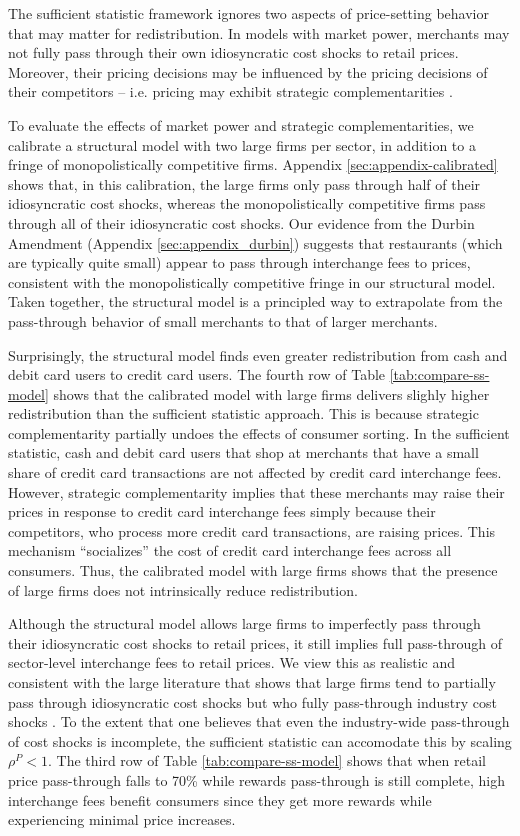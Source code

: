 \documentclass[main.tex]{subfiles}
\begin{document}
The sufficient statistic framework ignores two aspects of price-setting behavior that may matter for redistribution.
In models with market power, merchants may not fully pass through their own idiosyncratic cost shocks to retail prices.
Moreover, their pricing decisions may be influenced by the pricing decisions of their competitors -- i.e. pricing may exhibit strategic complementarities \citep{Amiti.etal2019}.

To evaluate the effects of market power and strategic complementarities, we calibrate a structural model with two large firms per sector, in addition to a fringe of monopolistically competitive firms.
Appendix \ref{sec:appendix-calibrated} shows that, in this calibration, the large firms only pass through half of their idiosyncratic cost shocks, whereas the monopolistically competitive firms pass through all of their idiosyncratic cost shocks.
Our evidence from the Durbin Amendment (Appendix \ref{sec:appendix_durbin}) suggests that restaurants (which are typically quite small) appear to pass through interchange fees to prices, consistent with the monopolistically competitive fringe in our structural model.
Taken together, the structural model is a principled way to extrapolate from the pass-through behavior of small merchants to that of larger merchants.

Surprisingly, the structural model finds even greater redistribution from cash and debit card users to credit card users.
The fourth row of Table \ref{tab:compare-ss-model} shows that the calibrated model with large firms delivers slighly higher redistribution than the sufficient statistic approach.
This is because strategic complementarity partially undoes the effects of consumer sorting.
In the sufficient statistic, cash and debit card users that shop at merchants that have a small share of credit card transactions are not affected by credit card interchange fees.
However, strategic complementarity implies that these merchants may raise their prices in response to credit card interchange fees simply because their competitors, who process more credit card transactions, are raising prices.
This mechanism ``socializes'' the cost of credit card interchange fees across all consumers.
Thus, the calibrated model with large firms shows that the presence of large firms does not intrinsically reduce redistribution.

Although the structural model allows large firms to imperfectly pass through their idiosyncratic cost shocks to retail prices, it still implies full pass-through of sector-level interchange fees to retail prices.
We view this as realistic and consistent with the large literature that shows that large firms tend to partially pass through idiosyncratic cost shocks but who fully pass-through industry cost shocks \citep{Amiti.etal2019, Sangani2026}.
To the extent that one believes that even the industry-wide pass-through of cost shocks is incomplete, the sufficient statistic can accomodate this by scaling $\rho^P<1$. The third row of Table \ref{tab:compare-ss-model} shows that when retail price pass-through falls to 70\% while rewards pass-through is still complete, high interchange fees benefit consumers since they get more rewards while experiencing minimal price increases.
\end{document}
